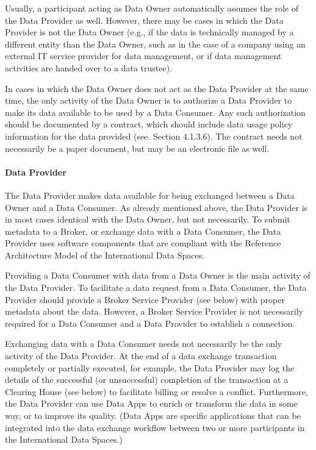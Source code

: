 Usually, a participant acting as Data Owner automatically assumes the role of the Data Provider as well. However, there may be cases in which the Data Provider is not the Data Owner (e.g., if the data is technically managed by a different entity than the Data Owner, such as in the case of a company using an external IT service provider for data management, or if data management activities are handed over to a data trustee).

In cases in which the Data Owner does not act as the Data Provider at the same time, the only activity of the Data Owner is to authorize a Data Provider to make its data available to be used by a Data Consumer. Any such authorization should be documented by a contract, which should include data usage policy information for the data provided (see. Section 4.1.3.6). The contract needs not necessarily be a paper document, but may be an electronic file as well.

\paragraph{Data Provider}
The Data Provider makes data available for being exchanged between a Data Owner and a Data Consumer. As already mentioned above, the Data Provider is in most cases identical with the Data Owner, but not necessarily. To submit metadata to a Broker, or exchange data with a Data Consumer, the Data Provider uses software components that are compliant with the Reference Architecture Model of the International Data Spaces.

Providing a Data Consumer with data from a Data Owner is the main activity of the Data Provider. To facilitate a data request from a Data Consumer, the Data Provider should provide a Broker Service Provider (see below) with proper metadata about the data. However, a Broker Service Provider is not necessarily required for a Data Consumer and a Data Provider to establish a connection.

Exchanging data with a Data Consumer needs not necessarily be the only activity of the Data Provider. At the end of a data exchange transaction completely or partially executed, for example, the Data Provider may log the details of the successful (or unsuccessful) completion of the transaction at a Clearing House (see below) to facilitate billing or resolve a conflict. Furthermore, the Data Provider can use Data Apps to enrich or transform the data in some way, or to improve its quality. (Data Apps are specific applications that can be integrated into the data exchange workflow between two or more participants in the International Data Spaces.)


